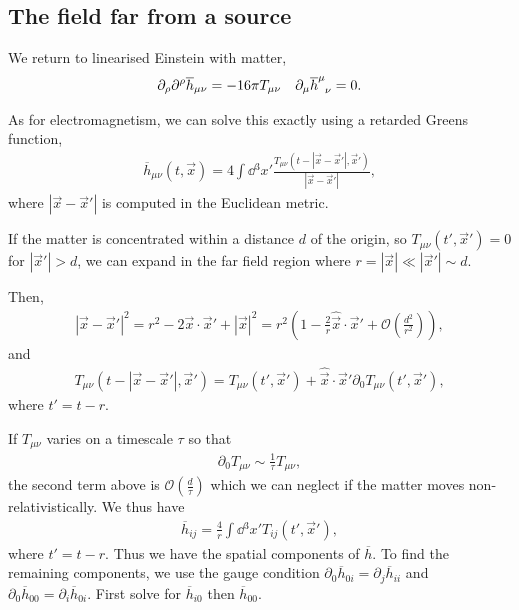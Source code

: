 
\subsection{The field far from a source}

We return to linearised Einstein with matter,
\begin{align}
    \partial_\rho \partial^{\rho} \overline{h}_{\mu \nu} = - 16 \pi T_{\mu \nu} && \partial_\mu \tensor{\overline{h}}{^{\mu}_\nu} = 0
.\end{align}

As for electromagnetism, we can solve this exactly using a retarded Greens function,
\begin{align}
    \overline{h}_{\mu \nu} \left( t,\vec{x} \right) = 4 \int \dd{^3x'} \frac{T_{\mu \nu}\left( t- \left| \vec{x}- \vec{x}' \right| , \vec{x}' \right) }{\left| \vec{x} - \vec{x}' \right| }
,\end{align}
where $\left| \vec{x} - \vec{x}' \right| $ is computed in the Euclidean metric.

If the matter is concentrated within a distance $d$ of the origin, so $T_{\mu \nu}\left( t',\vec{x}' \right)  = 0$ for $\left| \vec{x}' \right| > d$, we can expand in the far field region where $r = \left| \vec{x} \right| \ll \left| \vec{x}' \right| \sim d$.

Then, 
\begin{align}
    \left| \vec{x} - \vec{x}' \right|^2 = r^2 - 2 \vec{x} \cdot \vec{x}' + \left| \vec{x} \right|^2 = r^2 \left( 1 - \frac{2}{r} \hat{\vec{x}} \cdot \vec{x}' + \mathcal{O}\left( \frac{d^2}{r^2} \right) \right) 
,\end{align}
and
\begin{align}
    T_{\mu \nu}\left( t - \left| \vec{x} - \vec{x}' \right| , \vec{x}' \right) = T_{\mu \nu} \left( t', \vec{x}' \right) + \hat{\vec{x}} \cdot \vec{x}' \partial_0T_{\mu \nu} \left( t', \vec{x}' \right) 
,\end{align}
where $t' = t - r$.

If $T_{\mu \nu}$ varies on a timescale $\tau$ so that
\begin{align}
    \partial_0 T_{\mu \nu} \sim  \frac{1}{\tau} T_{\mu \nu}
,\end{align}
the second term above is $\mathcal{O}\left( \frac{d}{\tau} \right)$ which we can neglect if the matter moves non-relativistically. We thus have
\begin{align}
    \overline{h}_{ij} = \frac{4}{r} \int \dd{^3x'} T_{ij} \left( t', \vec{x}' \right) 
,\end{align}
where $t' = t - r$. Thus we have the spatial components of $\overline{h}$. To find the remaining components, we use the gauge condition $\partial_0 \overline{h}_{0i} = \partial_j \overline{h}_{ii}$ and $\partial_0 \overline{h}_{0 0} = \partial_i \overline{h}_{0 i}$. First solve for $\overline{h}_{i 0 }$ then $\overline{h}_{0 0}$.

